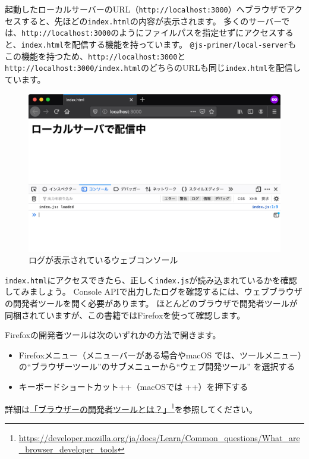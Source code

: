 起動したローカルサーバーのURL（\texttt{http://localhost:3000}）へブラウザでアクセスすると、先ほどの\texttt{index.html}の内容が表示されます。
多くのサーバーでは、\texttt{http://localhost:3000}のようにファイルパスを指定せずにアクセスすると、\texttt{index.html}を配信する機能を持っています。
\texttt{@js-primer/local-server}もこの機能を持つため、\texttt{http://localhost:3000}と\texttt{http://localhost:3000/index.html}のどちらのURLも同じ\texttt{index.html}を配信しています。

\begin{figure}[h]
\centering
\includegraphics[width=120mm]{fig/index.pdf}
\caption{ログが表示されているウェブコンソール}
\end{figure}

\texttt{index.html}にアクセスできたら、正しく\texttt{index.js}が読み込まれているかを確認してみましょう。
Console
APIで出力したログを確認するには、ウェブブラウザの開発者ツールを開く必要があります。
ほとんどのブラウザで開発者ツールが同梱されていますが、この書籍ではFirefoxを使って確認します。

Firefoxの開発者ツールは次のいずれかの方法で開きます。

\begin{itemize}
\item
  Firefoxメニュー（メニューバーがある場合やmacOS
  では、ツールメニュー）の``ブラウザーツール''のサブメニューから``ウェブ開発ツール''
  を選択する
\item
  キーボードショートカット++（macOSでは
  ++）を押下する
\end{itemize}

詳細は\href{https://developer.mozilla.org/ja/docs/Learn/Common_questions/What_are_browser_developer_tools}{「ブラウザーの開発者ツールとは？」}\footnote{\url{https://developer.mozilla.org/ja/docs/Learn/Common_questions/What_are_browser_developer_tools}}を参照してください。

